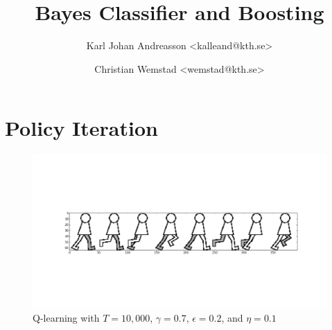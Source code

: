 \documentclass[a4paper]{article}
\title{Bayes Classifier and Boosting}
\author{Karl Johan Andreasson <{kalleand@kth.se}> %
\and Christian Wemstad <{wemstad@kth.se}> %
}
\begin{document}
\thispagestyle{empty}
\maketitle
\thispagestyle{empty}
\pagestyle{empty}
\newpage
\pagestyle{fancy}
\setcounter{page}{1}
\section{Policy Iteration}
\begin{figure}[h!]
    \centering
    \includegraphics[width=1\textwidth]{qlearning1.png}
    \caption{Q-learning with $T = 10,000$, $\gamma = 0.7$, $\epsilon = 0.2$, and
        $\eta = 0.1$}
\end{figure}
\end{document}
